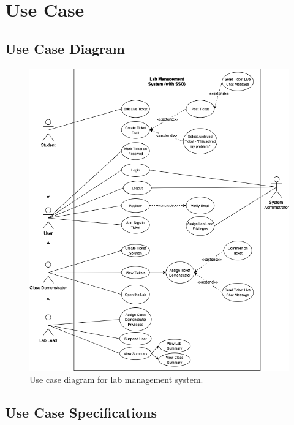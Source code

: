 \newpage
\section{Use Case}

\subsection{Use Case Diagram}

\begin{figure}[H]
    \centering
    \includegraphics[width=\textwidth]{4design/images/useCase.png}
    \caption{Use case diagram for lab management system.}
    \label{fig:useCase}
\end{figure}

\subsection{Use Case Specifications}

